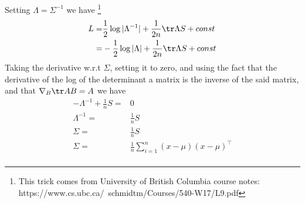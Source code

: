 \documentclass[12pt,english]{amsart}
\theoremstyle{definition}
\begin{document}
Setting $\Lambda=\Sigma^{-1}$ we have \footnote{This trick comes from University of British Columbia course notes: https://www.cs.ubc.ca/~schmidtm/Courses/540-W17/L9.pdf}
\begin{equation}
\begin{split}
    L 
=& \frac{1}{2}\log|\Lambda^{-1}| + \frac{1}{2n}\tr\Lambda S + const\\
=& -\frac{1}{2}\log|\Lambda| + \frac{1}{2n}\tr\Lambda S + const\\
\end{split}
\label{eq:loglike6}
\end{equation}
Taking the derivative w.r.t $\Sigma$, setting it to zero, and using the fact that the derivative of the log of the determinant a matrix is the inverse of the said matrix, and that $\nabla_B \tr AB=A$ we have
\begin{equation}
\begin{split}
 -\Lambda^{-1} + \frac{1}{n}S=&0\\
 \Lambda^{-1} =& \frac{1}{n}S\\
\Sigma =& \frac{1}{n}S\\
\Sigma =& \frac{1}{n}\sum_{i=1}^n(x-\mu)(x-\mu)^\top\\
\end{split}
\label{eq:loglike7}
\end{equation}
\end{document}
